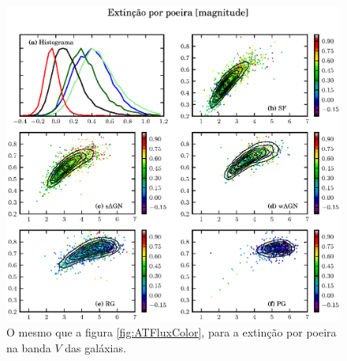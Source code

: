 \begin{figure}
	\includegraphics{figuras/uvcolor-color-AV-byclass.eps}
	\caption[Extinção por poeira no diagrama cor--cor.]
	{O mesmo que a figura \ref{fig:ATFluxColor}, para a extinção por
	poeira na banda $V$ das galáxias.}
	\label{fig:AVColor}
\end{figure}


